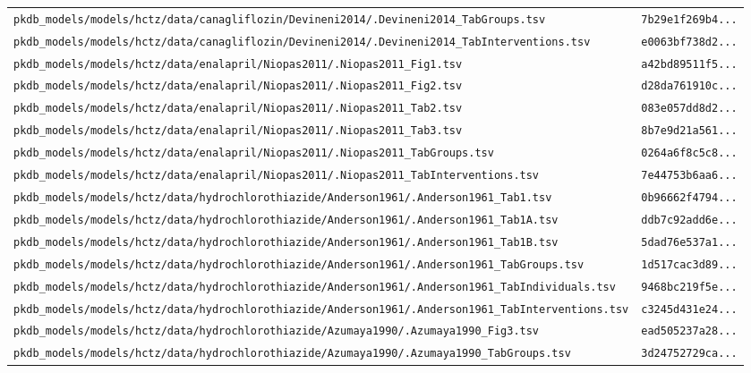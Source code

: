 \begin{longtable}{ll}
\texttt{pkdb\_models/models/hctz/data/canagliflozin/Devineni2014/.Devineni2014\_TabGroups.tsv} & \texttt{7b29e1f269b4...} \\
\texttt{pkdb\_models/models/hctz/data/canagliflozin/Devineni2014/.Devineni2014\_TabInterventions.tsv} & \texttt{e0063bf738d2...} \\
\texttt{pkdb\_models/models/hctz/data/enalapril/Niopas2011/.Niopas2011\_Fig1.tsv} & \texttt{a42bd89511f5...} \\
\texttt{pkdb\_models/models/hctz/data/enalapril/Niopas2011/.Niopas2011\_Fig2.tsv} & \texttt{d28da761910c...} \\
\texttt{pkdb\_models/models/hctz/data/enalapril/Niopas2011/.Niopas2011\_Tab2.tsv} & \texttt{083e057dd8d2...} \\
\texttt{pkdb\_models/models/hctz/data/enalapril/Niopas2011/.Niopas2011\_Tab3.tsv} & \texttt{8b7e9d21a561...} \\
\texttt{pkdb\_models/models/hctz/data/enalapril/Niopas2011/.Niopas2011\_TabGroups.tsv} & \texttt{0264a6f8c5c8...} \\
\texttt{pkdb\_models/models/hctz/data/enalapril/Niopas2011/.Niopas2011\_TabInterventions.tsv} & \texttt{7e44753b6aa6...} \\
\texttt{pkdb\_models/models/hctz/data/hydrochlorothiazide/Anderson1961/.Anderson1961\_Tab1.tsv} & \texttt{0b96662f4794...} \\
\texttt{pkdb\_models/models/hctz/data/hydrochlorothiazide/Anderson1961/.Anderson1961\_Tab1A.tsv} & \texttt{ddb7c92add6e...} \\
\texttt{pkdb\_models/models/hctz/data/hydrochlorothiazide/Anderson1961/.Anderson1961\_Tab1B.tsv} & \texttt{5dad76e537a1...} \\
\texttt{pkdb\_models/models/hctz/data/hydrochlorothiazide/Anderson1961/.Anderson1961\_TabGroups.tsv} & \texttt{1d517cac3d89...} \\
\texttt{pkdb\_models/models/hctz/data/hydrochlorothiazide/Anderson1961/.Anderson1961\_TabIndividuals.tsv} & \texttt{9468bc219f5e...} \\
\texttt{pkdb\_models/models/hctz/data/hydrochlorothiazide/Anderson1961/.Anderson1961\_TabInterventions.tsv} & \texttt{c3245d431e24...} \\
\texttt{pkdb\_models/models/hctz/data/hydrochlorothiazide/Azumaya1990/.Azumaya1990\_Fig3.tsv} & \texttt{ead505237a28...} \\
\texttt{pkdb\_models/models/hctz/data/hydrochlorothiazide/Azumaya1990/.Azumaya1990\_TabGroups.tsv} & \texttt{3d24752729ca...} \\

\end{longtable}
